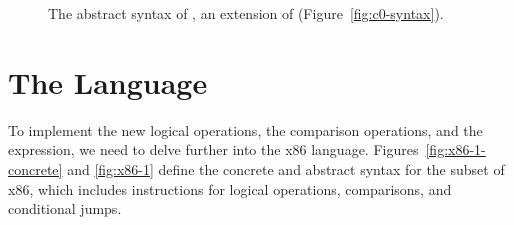 \documentclass[11pt]{book}
\newcommand{\gray}[1]{{\color{gray} #1}}
\begin{document}
\begin{figure}[tp]
\fbox{
\begin{minipage}{0.96\textwidth}
\small    
\[
\begin{array}{lcl}
\Atm &::=& \gray{\INT{\Int} \mid \VAR{\Var}} \mid \BOOL{\itm{bool}} \\
\itm{cmp} &::= & \key{eq?} \mid \key{<}  \\
\Exp &::= & \gray{ \Atm \mid \READ{} }\\
     &\mid& \gray{ \NEG{\Atm} \mid \ADD{\Atm}{\Atm} } \\
     &\mid& \UNIOP{\key{'not}}{\Atm} 
     \mid \BINOP{\key{'}\itm{cmp}}{\Atm}{\Atm} \\
\Stmt &::=& \gray{ \ASSIGN{\VAR{\Var}}{\Exp} } \\
\Tail &::= & \gray{\RETURN{\Exp} \mid \SEQ{\Stmt}{\Tail} } 
    \mid \GOTO{\itm{label}} \\
    &\mid& \IFSTMT{\BINOP{\itm{cmp}}{\Atm}{\Atm}}{\GOTO{\itm{label}}}{\GOTO{\itm{label}}} \\
\LangCIf{} & ::= & \gray{\CPROGRAM{\itm{info}}{\LP\LP\itm{label}\,\key{.}\,\Tail\RP\ldots\RP}}
\end{array}
\]
\end{minipage}
}
\caption{The abstract syntax of \LangCIf{}, an extension of \LangCVar{}
  (Figure~\ref{fig:c0-syntax}).}
\label{fig:c1-syntax}
\end{figure}

\section{The \LangXIf{} Language}
\label{sec:x86-if}

 To implement the new logical operations, the comparison
operations, and the  expression, we need to delve further into
the x86 language. Figures~\ref{fig:x86-1-concrete} and \ref{fig:x86-1}
define the concrete and abstract syntax for the \LangXIf{} subset
of x86, which includes instructions for logical operations,
comparisons, and conditional jumps.
\end{document}
